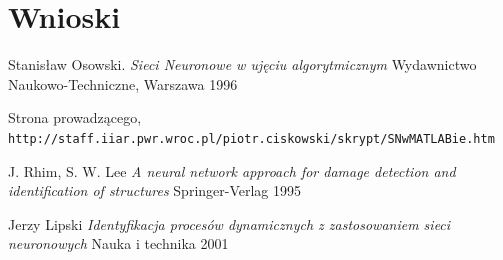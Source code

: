 \documentclass{article}
\begin{document}
\section{Wnioski}



\newpage
\begin{thebibliography}{9}

Stanisław Osowski.
\textit{Sieci Neuronowe w ujęciu algorytmicznym}
Wydawnictwo Naukowo-Techniczne, Warszawa 1996

Strona prowadzącego,
\\\texttt{http://staff.iiar.pwr.wroc.pl/piotr.ciskowski/skrypt/SNwMATLABie.htm}

J. Rhim, S. W. Lee 
\textit{A neural network approach for damage detection and identification of structures}
Springer-Verlag 1995

Jerzy Lipski
\textit{Identyfikacja procesów dynamicznych z zastosowaniem sieci neuronowych}
Nauka i technika 2001

\end{thebibliography}
\end{document}
